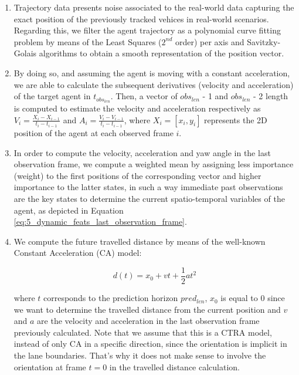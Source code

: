 \begin{enumerate}
	\item Trajectory data presents noise associated to the real-world data capturing the exact position of the previously tracked vehices in real-world scenarios. Regarding this, we filter the agent trajectory as a polynomial curve fitting problem by means of the Least Squares ($2^{nd}$ order) per axis and Savitzky-Golais \cite{savitzky1964smoothing} algorithms to obtain a smooth representation of the position vector.
	
	\item By doing so, and assuming the agent is moving with a constant acceleration, we are able to calculate the subsequent derivatives (velocity and acceleration) of the target agent in $t_{obs_{len}}$. Then, a vector of $obs_{len}$ - 1 and $obs_{len}$ - 2 length is computed to estimate the velocity and acceleration respectively as $V_{i}=\frac{X_{i}-X_{i-1}}{t_{i}-t_{i-1}}$ and $A_{i}=\frac{V_{i}-V_{i-1}}{t_{i}-t_{i-1}}$, where $X_{i}={[x_{i},y_{i}]}$ represents the 2D position of the agent at each observed frame $i$.
	
	\item In order to compute the velocity, acceleration and yaw angle in the last observation frame, we compute a weighted mean by assigning less importance (weight) to the first positions of the corresponding vector and higher importance to the latter states, in such a way immediate past observations are the key states to determine the current spatio-temporal variables of the agent, as depicted in Equation \ref{eq:5_dynamic_feats_last_observation_frame}.
	
	\item We compute the future travelled distance by means of the well-known Constant Acceleration (CA) model:
	
	\begin{equation}
		d(t) = x_0 + vt + \frac{1}{2}at^2
	\end{equation}
	
	where $t$ corresponds to the prediction horizon $pred_{len}$, $x_0$ is equal to $0$ since we want to determine the travelled distance from the current position and $v$ and $a$ are the velocity and acceleration in the last observation frame previously calculated. Note that we assume that this is a \ac{CTRA} model, instead of only \ac{CA} in a specific direction, since the orientation is implicit in the lane boundaries. That's why it does not make sense to involve the orientation at frame $t=0$ in the travelled distance calculation.
	

\end{enumerate}
